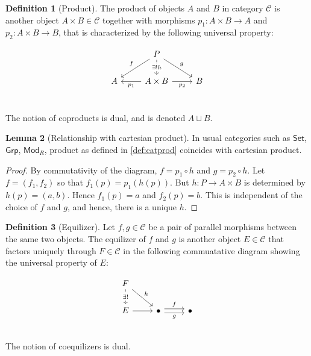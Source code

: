 \documentclass[10pt]{amsart}
\newcommand{\8}{\ensuremath{\infty}}
\newcommand{\0}{\ensuremath{\overset{\rightarrow}{0}}}
\newcommand{\1}{\ensuremath{\mathbf{1}}}
\newcommand{\C}{\ensuremath{\mathscr{C}}}
\newcommand{\Set}{\ensuremath{\mathsf{Set}}}
\newcommand{\Grp}{\ensuremath{\mathsf{Grp}}}
\newcommand{\Mod}{\ensuremath{\mathsf{Mod}}}
\theoremstyle{definition}
\newtheorem{definition}{Definition}[section]
\newtheorem{lemma}[definition]{Lemma}
\numberwithin{definition}{subsection}
\numberwithin{definition}{section}
\begin{document}
\begin{definition}[Product\label{def:catprod}]
  The product of objects $A$ and $B$ in category $\C$ is another object $A \times B \in \C$ together with morphisms $p_1: A \times B \rightarrow A$ and $p_2: A \times B \rightarrow B$, that is characterized by the following universal property:

  \begin{equation*}
    \begin{tikzcd}
      & P \arrow[dl, "f"'] \arrow[dr, "g"] \arrow[d, dashed, "\exists! h" description] & \\
      A & A \times B \arrow[l, "p_1"] \arrow[r, "p_2"'] & B \\
    \end{tikzcd}
  \end{equation*}

  The notion of coproducts is dual, and is denoted $A \sqcup B$.
\end{definition}

\begin{lemma}[Relationship with cartesian product]
  In usual categories such as \Set, \Grp, $\Mod_R$, product as defined in \ref{def:catprod} coincides with cartesian product.
\end{lemma}

\begin{proof}
  By commutativity of the diagram, $f = p_1 \circ h$ and $g = p_2 \circ h$. Let $f = (f_1, f_2)$ so that $f_1(p) = p_1(h(p))$. But $h : P \rightarrow A \times B$ is determined by $h(p) = (a, b)$. Hence $f_1(p) = a$ and $f_2(p) = b$. This is independent of the choice of $f$ and $g$, and hence, there is a unique $h$.
\end{proof}

\begin{definition}[Equilizer]
  Let $f, g \in \C$ be a pair of parallel morphisms between the same two objects. The equilizer of $f$ and $g$ is another object $E \in \C$ that factors uniquely through $F \in \C$ in the following commuatative diagram showing the universal property of $E$:

  \begin{equation*}
    \begin{tikzcd}
      F \arrow[d, dashed, "\exists!" description] \arrow[dr, "h"] & & \\
      E \arrow[r] & \bullet \arrow[r, shift left, "f"] \arrow[r, shift right, "g"'] & \bullet \\
    \end{tikzcd}
  \end{equation*}

  The notion of coequilizers is dual.
\end{definition}
\end{document}

